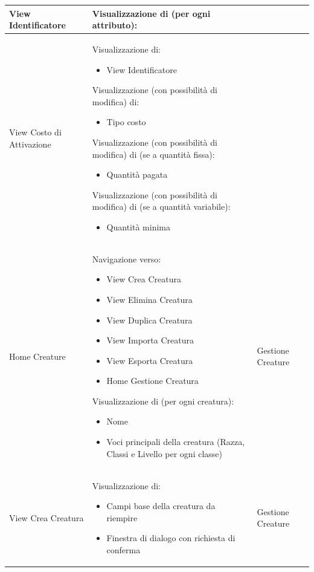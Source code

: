\documentclass[a4paper, 11pt]{article}
\begin{document}
\begin{adjustwidth}{-1.5cm}{-1.5cm}
\begin{center}
\begin{longtable}{|p{5cm}|p{5cm}|p{5cm}|}
        View Identificatore & Visualizzazione di (per ogni attributo): &  \\ \hline
        
        View Costo di Attivazione & Visualizzazione di:
        \begin{itemize}
            \item View Identificatore
        \end{itemize}
        Visualizzazione (con possibilità di modifica) di:
        \begin{itemize}
            \item Tipo costo
        \end{itemize}
        Visualizzazione (con possibilità di modifica) di (se a quantità fissa):
        \begin{itemize}
            \item Quantità pagata
        \end{itemize}
        Visualizzazione (con possibilità di modifica) di (se a quantità variabile):
        \begin{itemize}
            \item Quantità minima
        \end{itemize} &  \\ \hline
        
        Home Creature & Navigazione verso:
        \begin{itemize}
            \item View Crea Creatura
            \item View Elimina Creatura
            \item View Duplica Creatura
            \item View Importa Creatura
            \item View Esporta Creatura
            \item Home Gestione Creatura
        \end{itemize}
        Visualizzazione di (per ogni creatura):
        \begin{itemize}
            \item Nome 
            \item Voci principali della creatura (Razza, Classi e Livello per ogni classe)
        \end{itemize} & Gestione Creature \\ \hline
        
        View Crea Creatura & Visualizzazione di:
        \begin{itemize}
            \item Campi base della creatura da riempire
            \item Finestra di dialogo con richiesta di conferma
        \end{itemize} & Gestione Creature \\ \hline
        

\end{longtable}
\end{center}
\end{adjustwidth}
\end{document}
